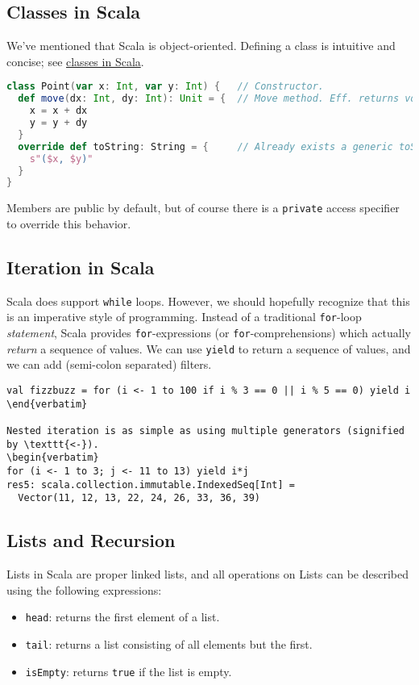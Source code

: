 \documentclass[12pt,letterpaper,twoside]{article}
\begin{document}
\subsection{Classes in Scala} We've mentioned that Scala is object-oriented.
Defining a class is intuitive and concise; see \href{https://docs.scala-lang.org/tour/classes.html}{classes in Scala}.

\begin{lstlisting}[language=Scala]
class Point(var x: Int, var y: Int) {   // Constructor.
  def move(dx: Int, dy: Int): Unit = {  // Move method. Eff. returns void.
    x = x + dx
    y = y + dy
  }
  override def toString: String = {     // Already exists a generic toString...
    s"($x, $y)"
  }
}
\end{lstlisting}
Members are public by default, but of course there is a \texttt{private} access
specifier to override this behavior.

\subsection{Iteration in Scala} Scala does support \texttt{while} loops. However, we should hopefully recognize that this is an imperative style of programming.
Instead of a traditional \texttt{for}-loop \emph{statement}, Scala provides
\texttt{for}-expressions (or \texttt{for}-comprehensions) which actually
\emph{return} a sequence of values. We can use \texttt{yield} to
return a sequence of values, and we can add (semi-colon separated) filters.

\begin{verbatim}
val fizzbuzz = for (i <- 1 to 100 if i % 3 == 0 || i % 5 == 0) yield i \end{verbatim}

Nested iteration is as simple as using multiple generators (signified by \texttt{<-}).
\begin{verbatim}
for (i <- 1 to 3; j <- 11 to 13) yield i*j
res5: scala.collection.immutable.IndexedSeq[Int] = 
  Vector(11, 12, 13, 22, 24, 26, 33, 36, 39) \end{verbatim} 

\subsection{Lists and Recursion}
Lists in Scala are proper linked lists, and all operations on Lists can
be described using the following expressions:
\begin{itemize}   \item \texttt{head}: returns the first element of a list.
  \item \texttt{tail}: returns a list consisting of all elements but the first.
  \item \texttt{isEmpty}: returns \texttt{true} if the list is empty. \end{itemize}
\end{document}
